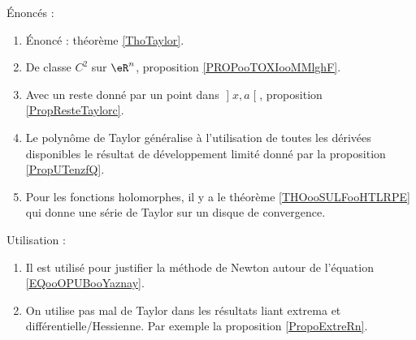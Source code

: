 

Énoncés :

    \begin{enumerate}
    \item
        Énoncé : théorème \ref{ThoTaylor}.
    \item
        De classe \( C^2\) sur \( \eR^n\), proposition \ref{PROPooTOXIooMMlghF}.
    \item
    Avec un reste donné par un point dans \( \mathopen] x , a \mathclose[\), proposition \ref{PropResteTaylorc}.

        \item
            Le polynôme de Taylor généralise à l'utilisation de toutes les dérivées disponibles le résultat de développement limité donné par la proposition \ref{PropUTenzfQ}.
        \item
            Pour les fonctions holomorphes, il y a le théorème \ref{THOooSULFooHTLRPE} qui donne une série de Taylor sur un disque de convergence.
        \end{enumerate}

Utilisation :
\begin{enumerate}
        \item
            Il est utilisé pour justifier la méthode de Newton autour de l'équation \eqref{EQooOPUBooYaznay}.
    \item
        On utilise pas mal de Taylor dans les résultats liant extrema et différentielle/Hessienne. Par exemple la proposition \ref{PropoExtreRn}.
\end{enumerate}
